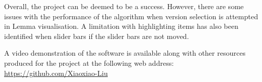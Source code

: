 Overall, the project can be deemed to be a success. However, there are some issues with the performance of the algorithm when version selection is attempted in Lemma visualisation. A limitation with highlighting items has also been identified when slider bars if the slider bars are not moved.

A video demonstration of the software is available along with other resources produced for the project at the following web address: \url{https://github.com/Xiaoxiao-Liu}
 


